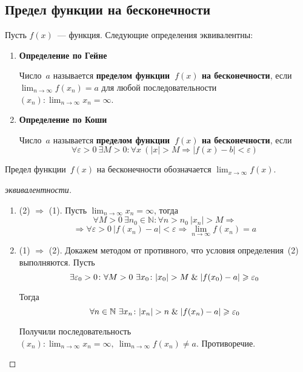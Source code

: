 \subsection{Предел функции на бесконечности}
Пусть $f(x)$~--- функция.
Следующие определения эквивалентны:
\begin{enumerate}
	\item \textbf{Определение по Гейне}
	
	Число~$a$ называется \textbf{пределом функции~$f(x)$ на бесконечности}, если $\displaystyle \lim_{n \to \infty} f(x_n) = a$ для любой последовательности~$\displaystyle (x_n): \lim_{n \to \infty} x_n = \infty$.
	
	\item \textbf{Определение по Коши}
	
	Число~$a$ называется \textbf{пределом функции~$f(x)$ на бесконечности}, если
	\begin{equation*}
	\forall \varepsilon > 0 \ \exists M > 0 \colon \forall x \ (|x| > M \Rightarrow |f(x) - b| < \varepsilon)
	\end{equation*}
\end{enumerate}

Предел функции~$f(x)$ на бесконечности обозначается $\displaystyle \lim_{x \to \infty} f(x)$.
\begin{proof}[эквивалентности]
\begin{enumerate}
	\item (2) $\Rightarrow$ (1).
	Пусть $\displaystyle \lim_{n \to \infty} x_n = \infty$, тогда
	\begin{equation*}
	\forall M > 0 \ \exists n_0 \in \mathbb N \colon \forall n > n_0 \ |x_n| > M \Rightarrow
	\end{equation*}
	\begin{equation*}
	\Rightarrow \forall \varepsilon > 0 \ |f(x_n) - a| < \varepsilon \Rightarrow
	\lim_{n \to \infty} f(x_n) = a
	\end{equation*}
	
	\item (1) $\Rightarrow$ (2).
	Докажем методом от противного, что условия определения~(2) выполняются.
	Пусть
	\begin{equation*}
	\exists \varepsilon_0 > 0 \colon \forall M > 0 \ \exists x_0 \colon |x_0| > M \mathrel{\&} |f(x_0) - a| \geqslant \varepsilon_0
	\end{equation*}
	
	Тогда
	\begin{equation*}
	\forall n \in \mathbb N \ \exists x_n \colon |x_n| > n \mathrel{\&} |f(x_n) - a| \geqslant \varepsilon_0
	\end{equation*}
	
	Получили последовательность $\displaystyle (x_n) \colon \lim_{n \to \infty} x_n = \infty, \ \lim_{n \to \infty} f(x_n) \neq a$.
	Противоречие.
\end{enumerate}
\end{proof}

